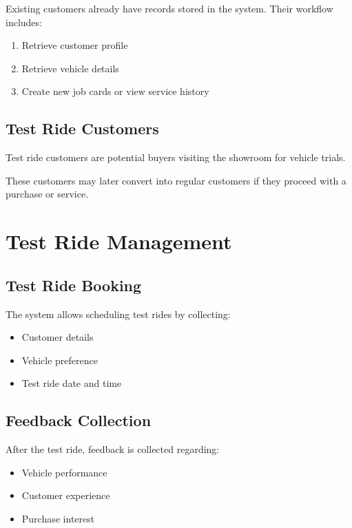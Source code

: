 \documentclass[12pt,a4paper]{report}
\begin{document}
Existing customers already have records stored in the system. Their workflow includes:

\begin{enumerate}
\item Retrieve customer profile
\item Retrieve vehicle details
\item Create new job cards or view service history
\end{enumerate}

\section{Test Ride Customers}

Test ride customers are potential buyers visiting the showroom for vehicle trials.

These customers may later convert into regular customers if they proceed with a purchase or service.

\chapter{Test Ride Management}

\section{Test Ride Booking}

The system allows scheduling test rides by collecting:

\begin{itemize}
\item Customer details
\item Vehicle preference
\item Test ride date and time
\end{itemize}

\section{Feedback Collection}

After the test ride, feedback is collected regarding:

\begin{itemize}
\item Vehicle performance
\item Customer experience
\item Purchase interest
\end{itemize}
\end{document}

